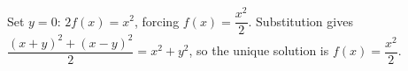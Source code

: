 Set $y=0$: $2f(x)=x^2$, forcing $f(x)=\dfrac{x^2}{2}$. Substitution gives $\dfrac{(x+y)^2+(x-y)^2}{2}=x^2+y^2$, so the unique solution is $\boxed{f(x)=\dfrac{x^2}{2}}$.
